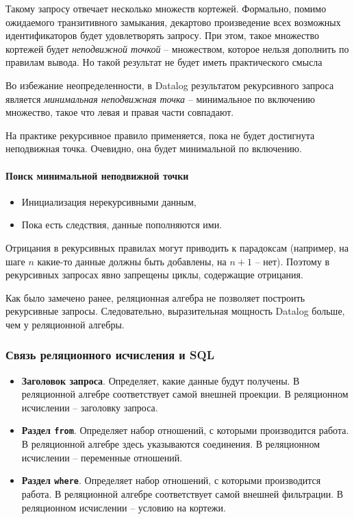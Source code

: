 Такому запросу отвечает несколько множеств кортежей. Формально, помимо ожидаемого транзитивного
замыкания, декартово произведение всех возможных идентификаторов будет удовлетворять запросу. При
этом, такое множество кортежей будет \textit{неподвижной точкой} -- множеством, которое нельзя дополнить
по правилам вывода. Но такой результат не будет иметь практического смысла

Во избежание неопределенности, в Datalog результатом рекурсивного запроса является
\textit{минимальная неподвижная точка} -- минимальное по включению множество, такое что левая и правая части
совпадают.

На практике рекурсивное правило применяется, пока не будет достигнута неподвижная точка. Очевидно,
она будет минимальной по включению.

\paragraph{Поиск минимальной неподвижной точки}

\begin{itemize}
	\item Инициализация нерекурсивными данным,
	\item Пока есть следствия, данные  пополняются ими.
\end{itemize}

\begin{remark}
	Отрицания в рекурсивных правилах могут приводить к парадоксам (например, на шаге
	$n$ какие-то данные должны быть добавлены, на $n + 1$ -- нет).
	Поэтому в рекурсивных запросах явно запрещены циклы, содержащие отрицания.
\end{remark}

\begin{remark}
	Как было замечено ранее, реляционная алгебра не позволяет построить рекурсивные запросы.
	Следовательно, выразительная мощность Datalog больше, чем у реляционной алгебры.
\end{remark}

\subsubsection{Связь реляционного исчисления и SQL}

\begin{itemize}
	\item \textbf{Заголовок запроса}. Определяет, какие данные будут получены. В реляционной
	      алгебре соответствует самой внешней проекции. В реляционном исчислении -- заголовку запроса.
	\item \textbf{Раздел \texttt{from}}. Определяет набор отношений, с которыми производится
	      работа. В реляционной алгебре здесь указываются соединения. В реляционном исчислении -- переменные
	      отношений.
	\item \textbf{Раздел \texttt{where}}. Определяет набор отношений, с которыми производится
	      работа. В реляционной алгебре соответствует самой внешней фильтрации. В реляционном исчислении --
	      условию на кортежи.
\end{itemize}


